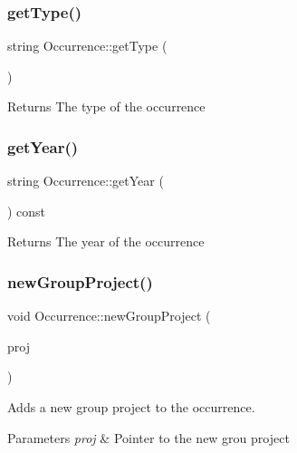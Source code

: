 \subsubsection{\texorpdfstring{get\+Type()}{getType()}}
{\footnotesize\ttfamily string Occurrence\+::get\+Type (\begin{DoxyParamCaption}{ }\end{DoxyParamCaption})}

\begin{DoxyReturn}{Returns}
The type of the occurrence 
\end{DoxyReturn}
\mbox{\label{class_occurrence_a47363caf55016c2c32641fa7e3f7ae69}} 
\subsubsection{\texorpdfstring{get\+Year()}{getYear()}}
{\footnotesize\ttfamily string Occurrence\+::get\+Year (\begin{DoxyParamCaption}{ }\end{DoxyParamCaption}) const}

\begin{DoxyReturn}{Returns}
The year of the occurrence 
\end{DoxyReturn}
\mbox{\label{class_occurrence_a7596dd133e475e6dcbb09efd3459ac08}} 
\subsubsection{\texorpdfstring{new\+Group\+Project()}{newGroupProject()}}
{\footnotesize\ttfamily void Occurrence\+::new\+Group\+Project (\begin{DoxyParamCaption}\item[{\hyperlink{classgroup_project}{group\+Project} $\ast$}]{proj }\end{DoxyParamCaption})}



Adds a new group project to the occurrence. 


\begin{DoxyParams}{Parameters}
{\em proj} & Pointer to the new grou project \\
\hline
\end{DoxyParams}
\mbox{\label{class_occurrence_a798338bb904c0320817ba139139a548a}} 
